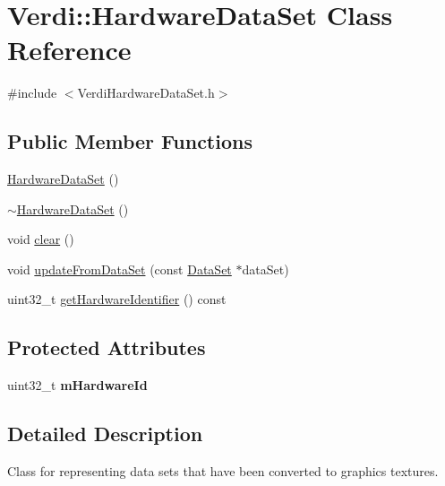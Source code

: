 \hypertarget{class_verdi_1_1_hardware_data_set}{\section{\-Verdi\-:\-:\-Hardware\-Data\-Set \-Class \-Reference}
\label{class_verdi_1_1_hardware_data_set}
}


{\ttfamily \#include $<$\-Verdi\-Hardware\-Data\-Set.\-h$>$}

\subsection*{\-Public \-Member \-Functions}
\begin{DoxyCompactItemize}
\item 
\hyperlink{class_verdi_1_1_hardware_data_set_a969a94625149897f01b388c6a8d2f4ad}{\-Hardware\-Data\-Set} ()
\item 
\hyperlink{class_verdi_1_1_hardware_data_set_a26aaf267d3f3266540c1ccbb6bc0d2a0}{$\sim$\-Hardware\-Data\-Set} ()
\item 
void \hyperlink{class_verdi_1_1_hardware_data_set_ae1b30c1d8e737579bd73428da6f4e5ff}{clear} ()
\item 
void \hyperlink{class_verdi_1_1_hardware_data_set_adbbdfee45d88fd5f7db4337d5efcf88a}{update\-From\-Data\-Set} (const \hyperlink{class_verdi_1_1_data_set}{\-Data\-Set} $\ast$data\-Set)
\item 
uint32\-\_\-t \hyperlink{class_verdi_1_1_hardware_data_set_a6d89cf1185418b09b4400fd9dc3de300}{get\-Hardware\-Identifier} () const 
\end{DoxyCompactItemize}
\subsection*{\-Protected \-Attributes}
\begin{DoxyCompactItemize}
\item 
\hypertarget{class_verdi_1_1_hardware_data_set_aaa4cc108d708c0433b16be0d50cc0c64}{uint32\-\_\-t {\bfseries m\-Hardware\-Id}}\label{class_verdi_1_1_hardware_data_set_aaa4cc108d708c0433b16be0d50cc0c64}

\end{DoxyCompactItemize}


\subsection{\-Detailed \-Description}
\-Class for representing data sets that have been converted to graphics textures. 

